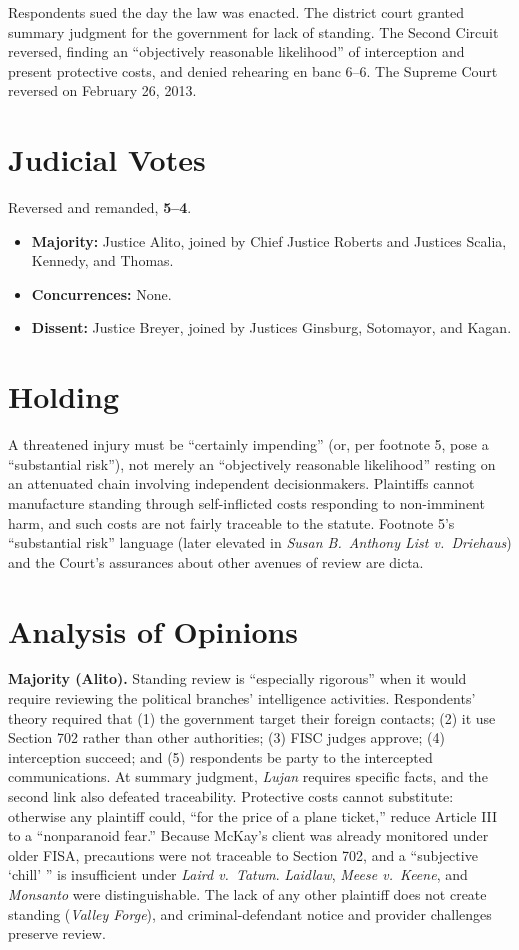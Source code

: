 \documentclass[12pt]{article}
\begin{document}
Respondents sued the day the law was enacted. The district court granted summary judgment for the government for lack of standing. The Second Circuit reversed, finding an ``objectively reasonable likelihood'' of interception and present protective costs, and denied rehearing en banc 6--6. The Supreme Court reversed on February 26, 2013.

\section{Judicial Votes}

Reversed and remanded, \textbf{5--4}.
\begin{itemize}
\item \textbf{Majority:} Justice Alito, joined by Chief Justice Roberts and Justices Scalia, Kennedy, and Thomas.
\item \textbf{Concurrences:} None.
\item \textbf{Dissent:} Justice Breyer, joined by Justices Ginsburg, Sotomayor, and Kagan.
\end{itemize}

\section{Holding}

A threatened injury must be ``certainly impending'' (or, per footnote 5, pose a ``substantial risk''), not merely an ``objectively reasonable likelihood'' resting on an attenuated chain involving independent decisionmakers. Plaintiffs cannot manufacture standing through self-inflicted costs responding to non-imminent harm, and such costs are not fairly traceable to the statute. Footnote 5's ``substantial risk'' language (later elevated in \textit{Susan B.\ Anthony List v.\ Driehaus}) and the Court's assurances about other avenues of review are dicta.

\section{Analysis of Opinions}

\textbf{Majority (Alito).} Standing review is ``especially rigorous'' when it would require reviewing the political branches' intelligence activities. Respondents' theory required that (1) the government target their foreign contacts; (2) it use Section 702 rather than other authorities; (3) FISC judges approve; (4) interception succeed; and (5) respondents be party to the intercepted communications. At summary judgment, \textit{Lujan} requires specific facts, and the second link also defeated traceability. Protective costs cannot substitute: otherwise any plaintiff could, ``for the price of a plane ticket,'' reduce Article III to a ``nonparanoid fear.'' Because McKay's client was already monitored under older FISA, precautions were not traceable to Section 702, and a ``subjective `chill' '' is insufficient under \textit{Laird v.\ Tatum}. \textit{Laidlaw}, \textit{Meese v.\ Keene}, and \textit{Monsanto} were distinguishable. The lack of any other plaintiff does not create standing (\textit{Valley Forge}), and criminal-defendant notice and provider challenges preserve review.
\end{document}
